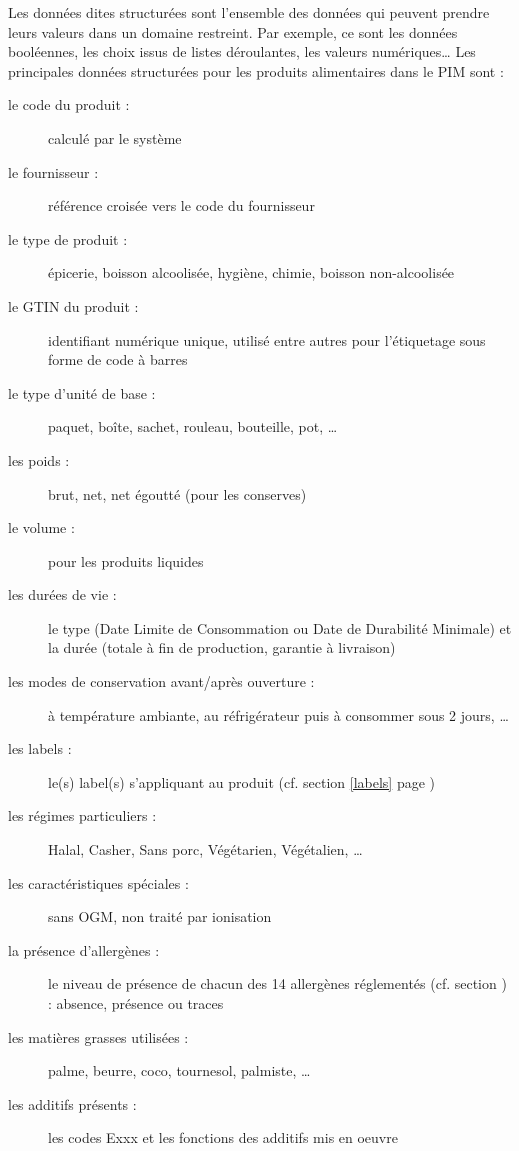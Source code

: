         Les données dites structurées sont l'ensemble des données qui peuvent prendre leurs valeurs dans un domaine restreint.
        Par exemple, ce sont les données booléennes, les choix issus de listes déroulantes, les valeurs numériques\dots
        Les principales données structurées pour les produits alimentaires dans le PIM sont : 
        \begin{description}
            \item[le code du produit :] calculé par le système
            \item[le fournisseur :] référence croisée vers le code du fournisseur
            \item[le type de produit :] épicerie, boisson alcoolisée, hygiène, chimie, boisson non-alcoolisée
            \item[le GTIN du produit :] identifiant numérique unique, utilisé entre autres pour l'étiquetage sous forme de code à barres~\cite{GS1_GTIN}
            \item[le type d'unité de base :] paquet, boîte, sachet, rouleau, bouteille, pot, \dots
            \item[les poids :] brut, net, net égoutté (pour les conserves)
            \item[le volume :] pour les produits liquides
            \item[les durées de vie :] le type (Date Limite de Consommation ou Date de Durabilité Minimale) et la durée (totale à fin de production, garantie à livraison)
            \item[les modes de conservation avant/après ouverture :] à température ambiante, au réfrigérateur puis à consommer sous 2 jours, \dots
            \item[les labels :] le(s) label(s) s'appliquant au produit (cf. section \ref{labels} page \pageref{labels})
            \item[les régimes particuliers :] Halal, Casher, Sans porc, Végétarien, Végétalien, \dots
            \item[les caractéristiques spéciales :] sans OGM, non traité par ionisation
            \item[la présence d'allergènes :] le niveau de présence de chacun des 14 allergènes réglementés (cf. section ) : absence, présence ou traces
            \item[les matières grasses utilisées :] palme, beurre, coco, tournesol, palmiste, \dots
            \item[les additifs présents :] les codes Exxx et les fonctions des additifs mis en oeuvre~\cite{additifs_regl_eu}\cite{additifs_wiki}

\end{description}
